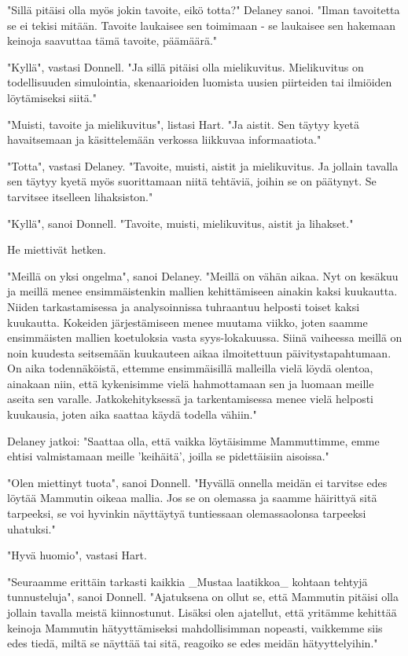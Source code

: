 "Sillä pitäisi olla myös jokin tavoite, eikö totta?" Delaney sanoi. "Ilman tavoitetta se ei tekisi mitään. Tavoite laukaisee sen toimimaan - se laukaisee sen hakemaan keinoja saavuttaa tämä tavoite, päämäärä."


"Kyllä", vastasi Donnell. "Ja sillä pitäisi olla mielikuvitus. Mielikuvitus on todellisuuden simulointia, skenaarioiden luomista uusien piirteiden tai ilmiöiden löytämiseksi siitä."


"Muisti, tavoite ja mielikuvitus", listasi Hart. "Ja aistit. Sen täytyy kyetä havaitsemaan ja käsittelemään verkossa liikkuvaa informaatiota."


"Totta", vastasi Delaney. "Tavoite, muisti, aistit ja mielikuvitus. Ja jollain tavalla sen täytyy kyetä myös suorittamaan niitä tehtäviä, joihin se on päätynyt. Se tarvitsee itselleen lihaksiston."


"Kyllä", sanoi Donnell. "Tavoite, muisti, mielikuvitus, aistit ja lihakset."


He miettivät hetken.


"Meillä on yksi ongelma", sanoi Delaney. "Meillä on vähän aikaa. Nyt on kesäkuu ja meillä menee ensimmäistenkin mallien kehittämiseen ainakin kaksi kuukautta. Niiden tarkastamisessa ja analysoinnissa tuhraantuu helposti toiset kaksi kuukautta. Kokeiden järjestämiseen menee muutama viikko, joten saamme ensimmäisten mallien koetuloksia vasta syys-lokakuussa. Siinä vaiheessa meillä on noin kuudesta seitsemään kuukauteen aikaa ilmoitettuun päivitystapahtumaan. On aika todennäköistä, ettemme ensimmäisillä malleilla vielä löydä olentoa, ainakaan niin, että kykenisimme vielä hahmottamaan sen ja luomaan meille aseita sen varalle. Jatkokehityksessä ja tarkentamisessa menee vielä helposti kuukausia, joten aika saattaa käydä todella vähiin."


Delaney jatkoi: "Saattaa olla, että vaikka löytäisimme Mammuttimme, emme ehtisi valmistamaan meille 'keihäitä', joilla se pidettäisiin aisoissa."


"Olen miettinyt tuota", sanoi Donnell. "Hyvällä onnella meidän ei tarvitse edes löytää Mammutin oikeaa mallia. Jos se on olemassa ja saamme häirittyä sitä tarpeeksi, se voi hyvinkin näyttäytyä tuntiessaan olemassaolonsa tarpeeksi uhatuksi."


"Hyvä huomio", vastasi Hart.


"Seuraamme erittäin tarkasti kaikkia _Mustaa laatikkoa_ kohtaan tehtyjä tunnusteluja", sanoi Donnell. "Ajatuksena on ollut se, että Mammutin pitäisi olla jollain tavalla meistä kiinnostunut. Lisäksi olen ajatellut, että yritämme kehittää keinoja Mammutin hätyyttämiseksi mahdollisimman nopeasti, vaikkemme siis edes tiedä, miltä se näyttää tai sitä, reagoiko se edes meidän hätyyttelyihin."




